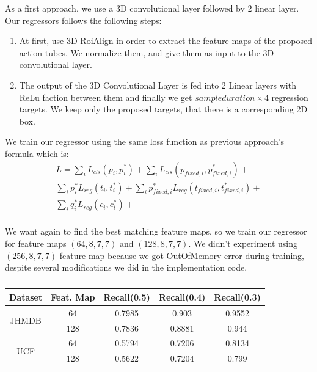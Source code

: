 As a first approach, we use a 3D convolutional layer followed by 2 linear layer. Our regressors follows the following steps:
\begin{enumerate}
\item At first, use 3D RoiAlign in order to extract the feature maps of the proposed action tubes. We normalize them, and give them as input to the 3D
  convolutional layer.
\item The output of the 3D Convolutional Layer is fed into 2 Linear layers with ReLu faction between them and finally we get $sample duration \times 4$
  regression targets. We keep only the proposed targets, that there is a corresponding 2D box.
\end{enumerate}


We train our regressor using the same loss function as previous approach's formula which is:
\begin{equation*} 
\begin{split}
 L  =  \sum_iL_{cls}(p_i, p_i^*) + \sum_iL_{cls}(p_{fixed,i}, p_{fixed,i}^*) + \\
 \sum_ip_i^*L_{reg}(t_i,t_i^*) + \sum_ip_{fixed,i}^*L_{reg}(t_{fixed,i},t_{fixed,i}^*) + \\
  \sum_iq_i^*L_{reg}(c_{i}, c_{i}^*) + \\
\end{split}
\end{equation*}

We want again to find the best matching feature maps, so we train our regressor for feature maps
$(64,8,7,7)$ and $(128,8,7,7)$. We didn't experiment using $(256,8,7,7)$ feature map because
we got OutOfMemory error during training, despite several modifications we did in the
implementation code.

\begin{table}[h]
  \centering
  \begin{tabular}{||c | c || c  c  c||}
    \hline
    \textbf{Dataset} & \textbf{Feat. Map} & \textbf{Recall(0.5)} & \textbf{Recall(0.4)} & \textbf{Recall(0.3)}\\
    \hline
    \multirow{2}{*}{JHMDB} &  64 & 0.7985 & 0.903 & 0.9552 \\
    \cline{2-5}
    {} & 128 & 0.7836 & 0.8881 & 0.944\\
    \hline
    \multirow{2}{*}{UCF}  & 64 & 0.5794 & 0.7206 & 0.8134 \\
    \cline{2-5}
    {} & 128 & 0.5622 & 0.7204 & 0.799 \\
    \hline

  \end{tabular}
  \caption{}
  \label{table:reg_2_1}
\end{table}

